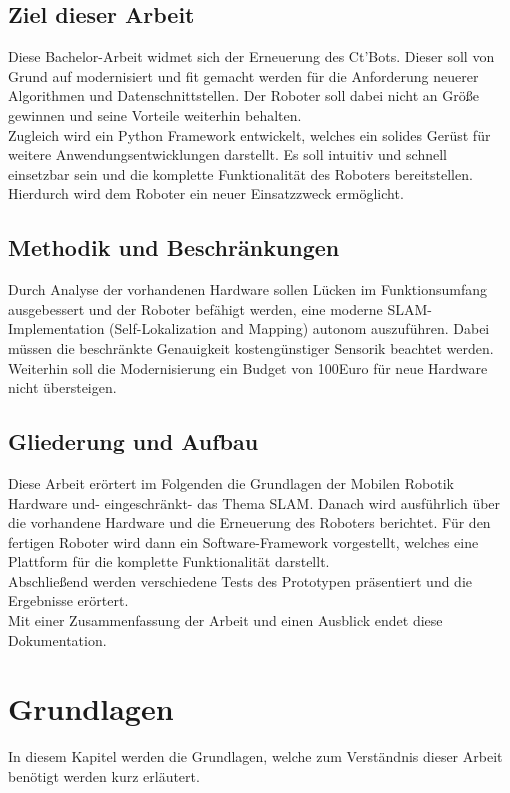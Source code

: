 \documentclass[a4paper,cleardoubleempty,BCOR1cm]{book}
\begin{document}
\section{Ziel dieser Arbeit}
Diese Bachelor-Arbeit widmet sich der Erneuerung des Ct'Bots. Dieser soll von Grund auf modernisiert und fit gemacht werden für die Anforderung neuerer Algorithmen und Datenschnittstellen. Der Roboter soll dabei nicht an Größe gewinnen und seine Vorteile weiterhin behalten. \\

Zugleich wird ein Python Framework entwickelt, welches ein solides Gerüst für weitere Anwendungsentwicklungen darstellt. Es soll intuitiv und schnell einsetzbar sein und die komplette Funktionalität des Roboters bereitstellen. Hierdurch wird dem Roboter ein neuer Einsatzzweck ermöglicht. \\


\section{Methodik und Beschränkungen}

Durch Analyse der vorhandenen Hardware sollen Lücken im Funktionsumfang ausgebessert und der Roboter befähigt werden, eine moderne SLAM-Implementation (Self-Lokalization and Mapping) autonom auszuführen. 
Dabei müssen die beschränkte Genauigkeit kostengünstiger Sensorik beachtet werden. Weiterhin soll die Modernisierung ein Budget von 100Euro für neue Hardware nicht übersteigen. 

\section{Gliederung und Aufbau}

Diese Arbeit erörtert im Folgenden die Grundlagen der Mobilen Robotik Hardware und- eingeschränkt- das Thema SLAM. Danach wird ausführlich über die vorhandene Hardware und die Erneuerung des Roboters berichtet. Für den fertigen Roboter wird dann ein Software-Framework vorgestellt, welches eine Plattform für die komplette Funktionalität darstellt. \\
Abschließend werden verschiedene  Tests des Prototypen präsentiert und die Ergebnisse erörtert. \\
Mit einer Zusammenfassung der Arbeit und einen Ausblick endet diese Dokumentation.  





\chapter{Grundlagen}
In diesem Kapitel werden die Grundlagen, welche zum Verständnis dieser Arbeit benötigt werden kurz erläutert.
\end{document}
